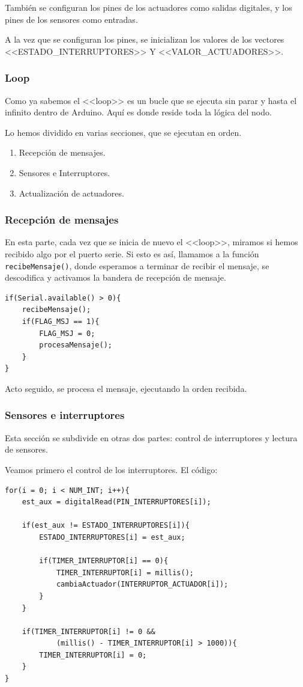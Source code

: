 También se configuran los pines de los actuadores como salidas digitales, y los pines de los sensores como entradas.

A la vez que se configuran los pines, se inicializan los valores de los vectores <<ESTADO\_INTERRUPTORES>> Y <<VALOR\_ACTUADORES>>.

\subsubsection{Loop}
Como ya sabemos el <<loop>> es un bucle que se ejecuta sin parar y hasta el infinito dentro de Arduino. Aquí es donde reside toda la lógica del nodo.

Lo hemos dividido en varias secciones, que se ejecutan en orden.

\begin{enumerate}
    \item Recepción de mensajes.
    \item Sensores e Interruptores.
    \item Actualización de actuadores.
\end{enumerate}

\subsubsection{Recepción de mensajes}
En esta parte, cada vez que se inicia de nuevo el <<loop>>, miramos si hemos recibido algo por el puerto serie. Si esto es así, llamamos a la función \lstinline|recibeMensaje()|, donde esperamos a terminar de recibir el mensaje, se descodifica y activamos la bandera de recepción de mensaje.

\begin{lstlisting}
if(Serial.available() > 0){
    recibeMensaje();
    if(FLAG_MSJ == 1){
        FLAG_MSJ = 0;
        procesaMensaje();
    }
}
\end{lstlisting}

Acto seguido, se procesa el mensaje, ejecutando la orden recibida.

\subsubsection{Sensores e interruptores}
Esta sección se subdivide en otras dos partes: control de interruptores y lectura de sensores.

Veamos primero el control de los interruptores. El código:
\begin{lstlisting}
for(i = 0; i < NUM_INT; i++){
    est_aux = digitalRead(PIN_INTERRUPTORES[i]);

    if(est_aux != ESTADO_INTERRUPTORES[i]){
        ESTADO_INTERRUPTORES[i] = est_aux;

        if(TIMER_INTERRUPTOR[i] == 0){
            TIMER_INTERRUPTOR[i] = millis();
            cambiaActuador(INTERRUPTOR_ACTUADOR[i]);
        }
    }

    if(TIMER_INTERRUPTOR[i] != 0 && 
            (millis() - TIMER_INTERRUPTOR[i] > 1000)){
        TIMER_INTERRUPTOR[i] = 0;
    }
}
\end{lstlisting}


